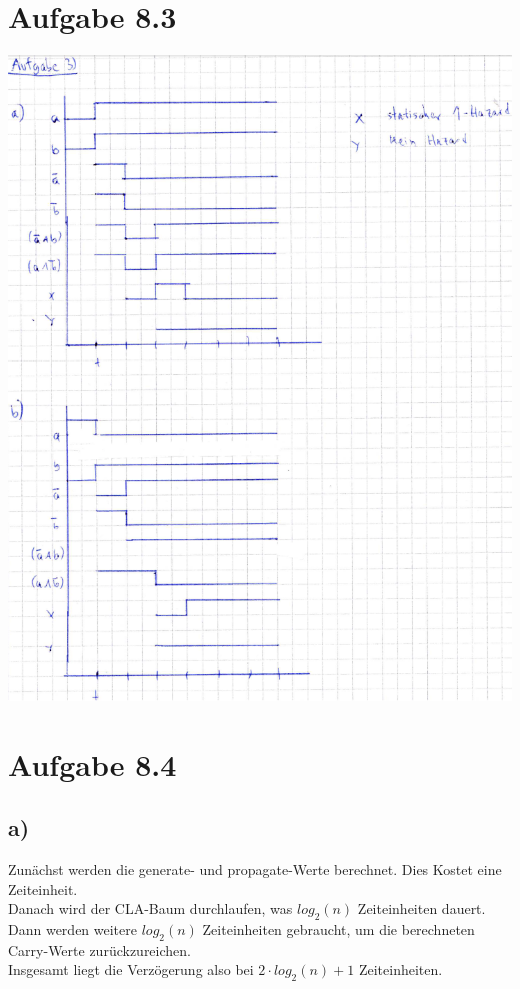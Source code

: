 \documentclass[a4paper]{scrartcl}
\begin{document}
\section{Aufgabe 8.3}
	\includegraphics[scale=0.55]{8_3.png}\\
\newpage
\section{Aufgabe 8.4}
	\subsection{a)}
	Zunächst werden die generate- und propagate-Werte berechnet. Dies Kostet eine Zeiteinheit.\\
	Danach wird der CLA-Baum durchlaufen, was \textit{$log_2 (n)$} Zeiteinheiten dauert.\\
	Dann werden weitere \textit{$log_2 (n)$} Zeiteinheiten gebraucht, um die berechneten Carry-Werte zurückzureichen.\\
	Insgesamt liegt die Verzögerung also bei \textit{$2 \cdot log_2 (n) + 1$} Zeiteinheiten.
	
\end{document}
